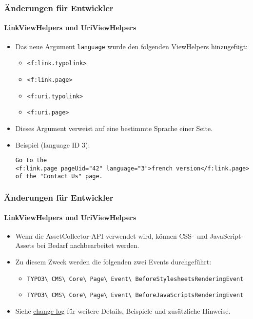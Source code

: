 \begin{frame}[fragile]
	\frametitle{Änderungen für Entwickler}
	\framesubtitle{LinkViewHelpers und UriViewHelpers}

	\lstset{basicstyle=\tiny\ttfamily}

	\begin{itemize}
		\item Das neue Argument \texttt{language} wurde den folgenden ViewHelpers hinzugefügt:
			\begin{itemize}
				\item \texttt{<f:link.typolink>}
				\item \texttt{<f:link.page>}
				\item \texttt{<f:uri.typolink>}
				\item \texttt{<f:uri.page>}
			\end{itemize}

		\item Dieses Argument verweist auf eine bestimmte Sprache einer Seite.
		\item Beispiel (language ID 3):
\begin{lstlisting}
Go to the
<f:link.page pageUid="42" language="3">french version</f:link.page>
of the "Contact Us" page.
\end{lstlisting}

	\end{itemize}

\end{frame}


\begin{frame}[fragile]
	\frametitle{Änderungen für Entwickler}
	\framesubtitle{LinkViewHelpers und UriViewHelpers}

	\begin{itemize}
		\item Wenn die AssetCollector-API verwendet wird, können CSS- und JavaScript-Assets
			bei Bedarf nachbearbeitet werden.
		\item Zu diesem Zweck werden die folgenden zwei Events durchgeführt:
			\begin{itemize}\smaller
				\item \texttt{TYPO3\textbackslash
					CMS\textbackslash
					Core\textbackslash
					Page\textbackslash
					Event\textbackslash
					BeforeStylesheetsRenderingEvent}
				\item \texttt{TYPO3\textbackslash
					CMS\textbackslash
					Core\textbackslash
					Page\textbackslash
					Event\textbackslash
					BeforeJavaScriptsRenderingEvent}
			\end{itemize}

		\item Siehe
			\href{https://docs.typo3.org/c/typo3/cms-core/master/en-us/Changelog/10.4/Feature-90899-IntroduceAssetPreRenderingEvents.html}{change log}
			für weitere Details, Beispiele und zusätzliche Hinweise.
	\end{itemize}

\end{frame}

